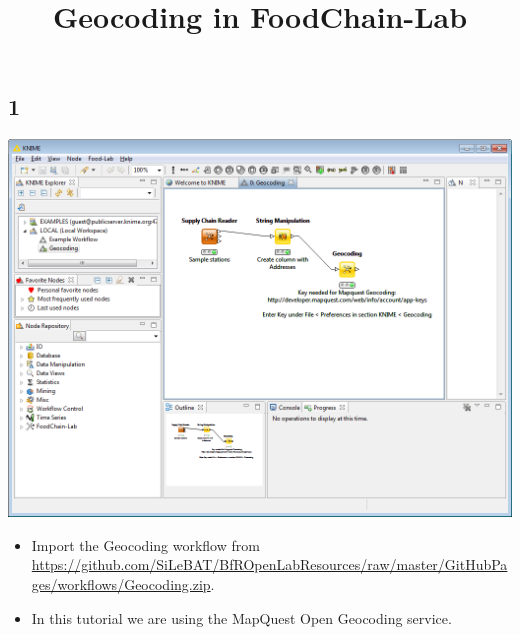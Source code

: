 \documentclass{beamer}
\title{Geocoding in FoodChain-Lab}
\date{}
\begin{document}
\maketitle

\section{ }
 
\subsection{1}
\begin{frame}
	\begin{center}
  		\includegraphics[height=0.6\textheight]{1.png}
	\end{center}
	\begin{itemize}
		\item Import the Geocoding workflow from \url{https://github.com/SiLeBAT/BfROpenLabResources/raw/master/GitHubPages/workflows/Geocoding.zip}.
		\item In this tutorial we are using the MapQuest Open Geocoding service.
	\end{itemize}
\end{frame}
\end{document}

